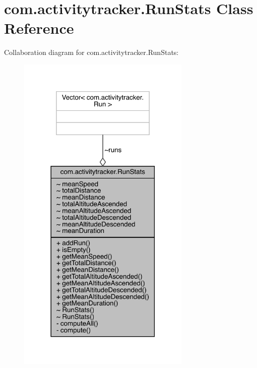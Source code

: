 \hypertarget{classcom_1_1activitytracker_1_1_run_stats}{}\section{com.\+activitytracker.\+Run\+Stats Class Reference}
\label{classcom_1_1activitytracker_1_1_run_stats}


Collaboration diagram for com.\+activitytracker.\+Run\+Stats\+:
\nopagebreak
\begin{figure}[H]
\begin{center}
\leavevmode
\includegraphics[width=234pt]{classcom_1_1activitytracker_1_1_run_stats__coll__graph}
\end{center}
\end{figure}
